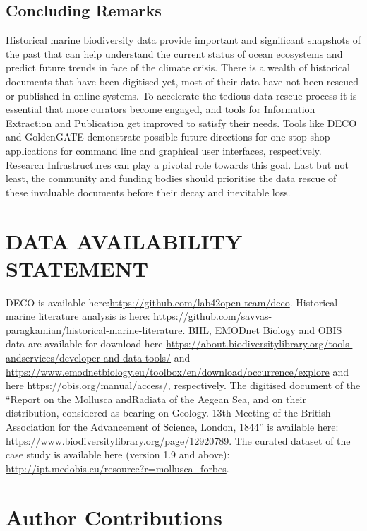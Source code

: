    \subsection{Concluding Remarks}
   Historical marine biodiversity data provide important and significant
snapshots of the past that can help understand the current status of ocean
ecosystems and predict future trends in face of the climate crisis. There is a
wealth of historical documents that have been digitised yet, most of their data
have not been rescued or published in online systems. To accelerate the tedious
data rescue process it is essential that more curators become engaged, and
tools for Information Extraction and Publication get improved to satisfy their
needs. Tools like DECO and GoldenGATE demonstrate possible future directions
for one-stop-shop applications for command line and graphical user interfaces,
respectively. Research Infrastructures can play a pivotal role towards this
goal. Last but not least, the community and funding bodies should prioritise
the data rescue of these invaluable documents before their decay and inevitable
loss.


\section*{DATA AVAILABILITY STATEMENT}

DECO is available here:\url{https://github.com/lab42open-team/deco}. Historical
marine literature analysis is here:
\href{https://github.com/savvas-paragkamian/historical-marine-literature}{https://github.com/savvas-paragkamian/historical-marine-literature}.
BHL, EMODnet Biology and OBIS data are available for download here
\href{https://about.biodiversitylibrary.org/tools-andservices/developer-and-data-tools/}{https://about.biodiversitylibrary.org/tools-andservices/developer-and-data-tools/}
and \url{https://www.emodnetbiology.eu/toolbox/en/download/occurrence/explore}
and here \url{https://obis.org/manual/access/}, respectively. The digitised
document of the “Report on the Mollusca andRadiata of the Aegean Sea, and on
their distribution, considered as bearing on Geology. 13th Meeting of the
British Association for the Advancement of Science, London, 1844” is available
here: \url{https://www.biodiversitylibrary.org/page/12920789}. The curated
dataset of the case study is available here (version 1.9 and above):
\url{http://ipt.medobis.eu/resource?r=mollusca_forbes}.

\section*{Author Contributions}

